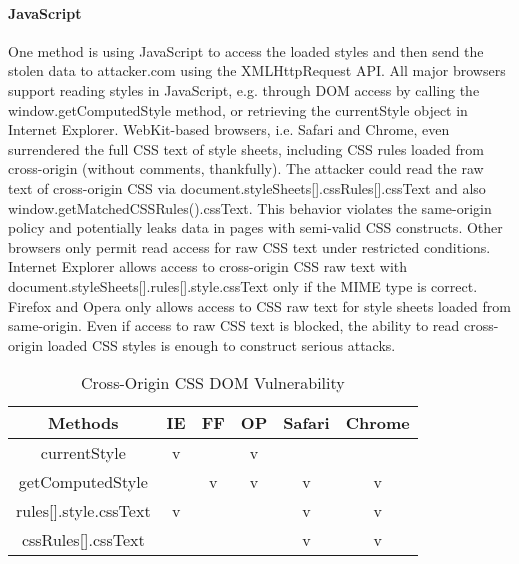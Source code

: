\documentclass{acm_proc_article-sp}
\begin{document}
{\paragraph{JavaScript}
One method is using JavaScript to access the loaded styles and then send the stolen data to attacker.com using the XMLHttpRequest API. All major browsers support reading styles in JavaScript, e.g. through DOM access by calling the window.getComputedStyle method, or retrieving the currentStyle object in Internet Explorer. WebKit-based browsers, i.e. Safari and Chrome, even surrendered the full CSS text of style sheets, including CSS rules loaded from cross-origin (without comments, thankfully). The attacker could read the raw text of cross-origin CSS via document.styleSheets[].cssRules[].cssText and also window.getMatchedCSSRules().cssText. This behavior violates the same-origin policy and potentially leaks data in pages with semi-valid CSS constructs. Other browsers only permit read access for raw CSS text under restricted conditions. Internet Explorer allows access to cross-origin CSS raw text with document.styleSheets[].rules[].style.cssText only if the MIME type is correct. Firefox and Opera only allows access to CSS raw text for style sheets loaded from same-origin.
Even if access to raw CSS text is blocked, the ability to read cross-origin loaded CSS styles is enough to construct serious attacks.


\begin{table}
\centering
\caption{Cross-Origin CSS DOM Vulnerability}
\begin{tabular}{|c|c|c|c|c|c|} \hline
Methods&IE&FF&OP&Safari&Chrome\\ \hline
currentStyle&v&&v&&\\ \hline
getComputedStyle&&v&v&v&v\\ \hline
rules[].style.cssText&v&&&v&v\\ \hline
cssRules[].cssText&&&&v&v\\
\hline\end{tabular}
\end{table}

}
\end{document}
